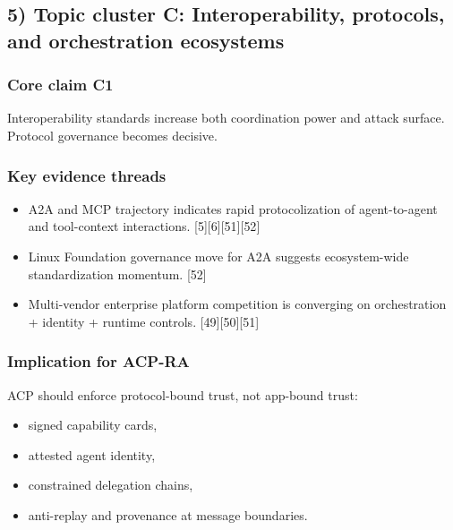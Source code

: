 \documentclass[11pt]{article}
\begin{document}
\hypertarget{topic-cluster-c-interoperability-protocols-and-orchestration-ecosystems}{%
\subsection{5) Topic cluster C: Interoperability, protocols, and
orchestration
ecosystems}\label{topic-cluster-c-interoperability-protocols-and-orchestration-ecosystems}}

\hypertarget{core-claim-c1}{%
\subsubsection{Core claim C1}\label{core-claim-c1}}

Interoperability standards increase both coordination power and attack
surface. Protocol governance becomes decisive.

\hypertarget{key-evidence-threads-2}{%
\subsubsection{Key evidence threads}\label{key-evidence-threads-2}}

\begin{itemize}
\tightlist
\item
  A2A and MCP trajectory indicates rapid protocolization of
  agent-to-agent and tool-context interactions.
  {[}5{]}{[}6{]}{[}51{]}{[}52{]}
\item
  Linux Foundation governance move for A2A suggests ecosystem-wide
  standardization momentum. {[}52{]}
\item
  Multi-vendor enterprise platform competition is converging on
  orchestration + identity + runtime controls. {[}49{]}{[}50{]}{[}51{]}
\end{itemize}

\hypertarget{implication-for-acp-ra-2}{%
\subsubsection{Implication for ACP-RA}\label{implication-for-acp-ra-2}}

ACP should enforce protocol-bound trust, not app-bound trust:

\begin{itemize}
\tightlist
\item
  signed capability cards,
\item
  attested agent identity,
\item
  constrained delegation chains,
\item
  anti-replay and provenance at message boundaries.
\end{itemize}
\end{document}

